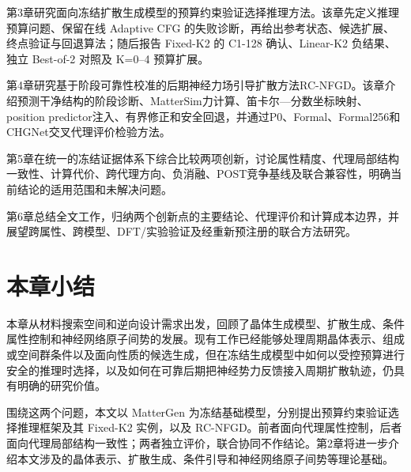 第3章研究面向冻结扩散生成模型的预算约束验证选择推理方法。该章先定义推理预算问题、保留在线 Adaptive CFG 的失败诊断，再给出参考状态、候选扩展、终点验证与回退算法；随后报告 Fixed-K2 的 C1-128 确认、Linear-K2 负结果、独立 Best-of-2 对照及 K=0--4 预算扩展。

第4章研究基于阶段可靠性校准的后期神经力场引导扩散方法RC-NFGD。该章介绍预测干净结构的阶段诊断、Matter\allowbreak Sim力计算、笛卡尔---分数坐标映射、position predictor注入、有界修正和安全回退，并通过P0、Formal、Formal256和CHGNet交叉代理评价检验方法。

第5章在统一的冻结证据体系下综合比较两项创新，讨论属性精度、代理局部结构一致性、计算代价、跨代理方向、负消融、POST竞争基线及联合兼容性，明确当前结论的适用范围和未解决问题。

第6章总结全文工作，归纳两个创新点的主要结论、代理评价和计算成本边界，并展望跨属性、跨模型、DFT/实验验证及经重新预注册的联合方法研究。

\section{本章小结}

本章从材料搜索空间和逆向设计需求出发，回顾了晶体生成模型、扩散生成、条件属性控制和神经网络原子间势的发展。现有工作已经能够处理周期晶体表示、组成或空间群条件以及面向性质的候选生成，但在冻结生成模型中如何以受控预算进行安全的推理时选择，以及如何在可靠后期把神经势力反馈接入周期扩散轨迹，仍具有明确的研究价值。

围绕这两个问题，本文以 MatterGen 为冻结基础模型，分别提出预算约束验证选择推理框架及其 Fixed-K2 实例，以及 RC-NFGD。前者面向代理属性控制，后者面向代理局部结构一致性；两者独立评价，联合协同不作结论。第2章将进一步介绍本文涉及的晶体表示、扩散生成、条件引导和神经网络原子间势等理论基础。
